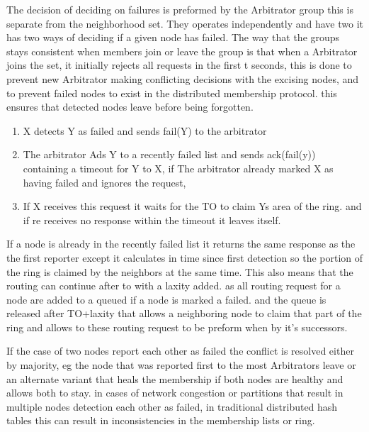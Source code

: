 \documentclass[a4paper,10pt,titlepage]{report}
\begin{document}
The decision of deciding on failures is preformed by the Arbitrator group this is separate from the neighborhood set. They operates independently and have two it has two ways of deciding if a given node has failed. The way that the groups stays consistent when members join or leave the group is that when a Arbitrator joins the set, it initially rejects all requests in the first t seconds, this is done to prevent new Arbitrator making conflicting decisions with the excising nodes, and to prevent failed nodes to exist in the distributed membership protocol. this ensures that detected nodes leave before being forgotten.\\
\vspace{5mm}

\begin{enumerate}
    \item X detects Y as failed and sends fail(Y) to the arbitrator
    \item The arbitrator Ads Y to a recently failed list and sends ack(fail(y)) containing a timeout for Y to X, if The arbitrator already marked X as having failed and ignores the request, 
    \item If X receives this request it waits for the TO to claim Ys area of the ring. and if re receives no response within the timeout it leaves itself.
\end{enumerate}

If a node is already in the recently failed list it returns the same response as the the first reporter except it calculates in time since first detection so the portion of the ring is claimed by the neighbors at the same time. This also means that the routing can continue after to with a laxity added. as all routing request for a node are added to a queued if a node is marked a failed. and the queue is released after TO+laxity that allows a neighboring node to claim that part of the ring and allows to these routing request to be preform when by it's successors.\\
\vspace{5mm}

If the case of two nodes report each other as failed the conflict is resolved either by majority, eg the node that was reported first to the most Arbitrators leave or an alternate variant that heals the membership if both nodes are healthy and allows both to stay. in cases of network congestion or partitions that result in multiple nodes detection each other as failed, in traditional distributed hash tables this can result in inconsistencies in the membership lists or ring. \\
\vspace{5mm}
\end{document}
